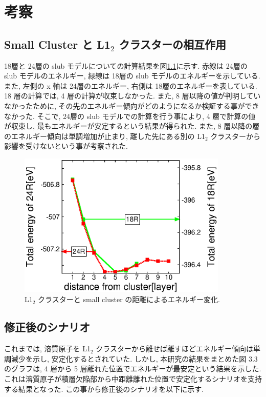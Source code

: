\chapter{考察}

\section{ Small Cluster と L1$_2$ クラスターの相互作用}
18層と 24層の slub モデルについての計算結果を図\ref{fig4.1}に示す. 赤線は 24層の slub モデルのエネルギー, 緑線は 18層の slub モデルのエネルギーを示している. また, 左側の x 軸は 24層のエネルギー, 右側は 18層のエネルギーを表している. 18 層の計算では, 4 層の計算が収束しなかった. また, 8 層以降の値が判明していなかったために, その先のエネルギー傾向がどのようになるか検証する事ができなかった. そこで, 24層の slub モデルでの計算を行う事により, 4 層で計算の値が収束し, 最もエネルギーが安定するという結果が得られた. また, 8 層以降の層のエネルギー傾向は単調増加が止まり, 離した先にある別の L1$_2$ クラスターから影響を受けないという事が考察された.


\begin{figure}[htbp]
\begin{center}
\includegraphics[width=100mm]{../consideration/smallcluster_18_24.eps}
\caption{L1$_2$ クラスターと small cluster の距離によるエネルギー変化.}
\label{fig4.1}
\end{center}
\end{figure}

\section{修正後のシナリオ}
これまでは, 溶質原子を L1$_2$ クラスターから離せば離すほどエネルギー傾向は単調減少を示し, 安定化するとされていた\cite{sakamoto}. しかし, 本研究の結果をまとめた図 3.3 のグラフは, 4 層から 5 層離れた位置でエネルギーが最安定という結果を示した. これは溶質原子が積層欠陥部から中距離離れた位置で安定化するシナリオを支持する結果となった.
この事から修正後のシナリオを以下に示す.

